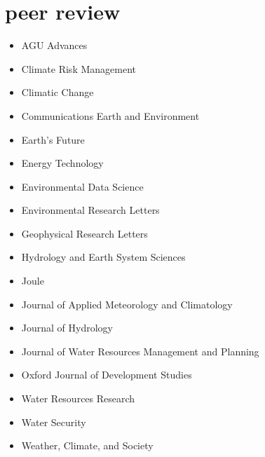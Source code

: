 \documentclass[10pt,oneside]{article}
\begin{document}

\section{peer review}

\mbox{}\vspace{-\dimexpr\baselineskip\relax}

\begin{itemize}[label={}]
  
    \item AGU Advances
  
    \item Climate Risk Management
  
    \item Climatic Change
  
    \item Communications Earth and Environment
  
    \item Earth's Future
  
    \item Energy Technology
  
    \item Environmental Data Science
  
    \item Environmental Research Letters
  
    \item Geophysical Research Letters
  
    \item Hydrology and Earth System Sciences
  
    \item Joule
  
    \item Journal of Applied Meteorology and Climatology
  
    \item Journal of Hydrology
  
    \item Journal of Water Resources Management and Planning
  
    \item Oxford Journal of Development Studies
  
    \item Water Resources Research
  
    \item Water Security
  
    \item Weather, Climate, and Society
  
\end{itemize}
\end{document}
